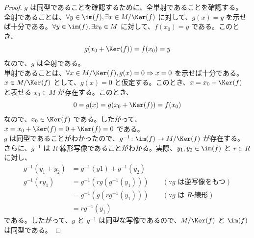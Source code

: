 \documentclass[article,paper=a4paper]{jlreq}
\begin{document}
\begin{proof}
  $g$ は同型であることを確認するために、全単射であることを確認する。\\
  \vspace{1\baselineskip}
  \quad 全射であることは、$\forall y\in\im(f),\exists x\in M/\Ker(f)$ に対して、$g(x)=y$ を示せば十分である。$\forall y\in\im(f),\exists x_0\in M$ に対して、$f(x_0)=y$ である。このとき、
  \[g(x_0 + \Ker(f)) = f(x_0) = y\]
  なので、$g$ は全射である。\\
  \quad 単射であることは、$\forall x\in M/\Ker(f), g(x)=0 \Rightarrow x=0$ を示せば十分である。$x\in M/\Ker(f)$ として、$g(x)=0$ と仮定する。このとき、$x = x_0 + \Ker(f)$ と表せる $x_0 \in M$ が存在する。このとき、
  \[0 = g(x) = g(x_0 + \Ker(f)) = f(x_0)\]
  なので、$x_0 \in \Ker(f)$ である。したがって、$x = x_0 + \Ker(f) = 0 + \Ker(f) = 0$ である。\\
  $g$ は同型であることがわかったので、$g^{-1} \colon \im(f) \to M/\Ker(f)$ が存在する。さらに、$g^{-1}$ は $R$-\hspace{0pt}線形写像であることがわかる。実際、$y_1, y_2 \in \im(f)$ と $r \in R$ に対し、
  \begin{align*}
    g^{-1}(y_1 + y_2) &= g^{-1}(y1) + g^{-1}(y_2) \\
    g^{-1}(ry_1) &= g^{-1}(r g(g^{-1}(y_1))) \qquad (\because g \text{ は逆写像をもつ})\\
    &= g^{-1}(g(r g^{-1}(y_1))) \qquad (\because g \text{ は } R\text{-線形})\\
    &= r g^{-1}(y_1)
  \end{align*}
  である。したがって、$g$ と $g^{-1}$ は同型な写像であるので、$M/\Ker(f)$ と $\im(f)$ は同型である。
\end{proof}
\end{document}
